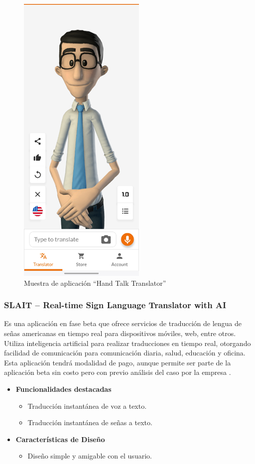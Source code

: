 \begin{figure} [h]
    \centering
    \includegraphics[width=0.25\linewidth]{figuras/handTalk.png}
    \caption{Muestra de aplicación “Hand Talk Translator”}
    \label{fig:enter-label}
\end{figure}


\subsubsection{SLAIT – Real-time Sign Language Translator with AI}

Es una aplicación en fase beta que ofrece servicios de traducción de lengua de señas americanas en tiempo real para dispositivos móviles, web, entre otros. Utiliza inteligencia artificial para realizar traducciones en tiempo real, otorgando facilidad de comunicación para comunicación diaria, salud, educación y oficina. Esta aplicación tendrá modalidad de pago, aunque permite ser parte de la aplicación beta sin costo pero con previo análisis del caso por la empresa \cite{SLAIT}.

\begin{itemize}
    \item \textbf{Funcionalidades destacadas}
    \begin{itemize}
        \item Traducción instantánea de voz a texto.
        \item Traducción instantánea de señas a texto.
    \end{itemize}

    \item \textbf{Características de Diseño}
    \begin{itemize}
        \item Diseño simple y amigable con el usuario.
    \end{itemize}
\end{itemize}

